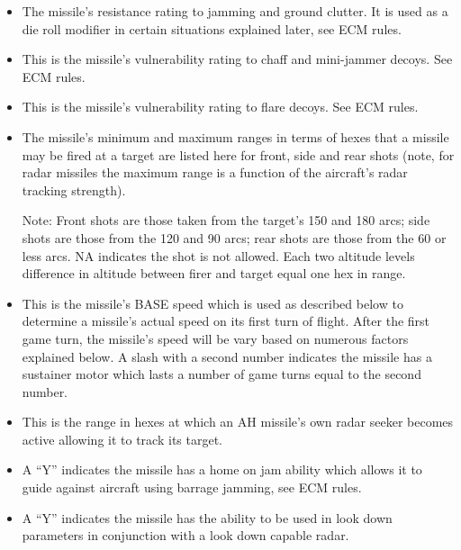 {\begin{itemize}
    \item {} The missile's resistance rating to jamming and ground clutter. It is used as a die roll modifier in certain situations explained later, see ECM rules.

    \item {} This is the missile's vulnerability rating to chaff and mini-jammer decoys. See ECM rules.

    \item {} This is the missile's vulnerability rating to flare decoys. See ECM rules.

    \item {} The missile's minimum and maximum ranges in terms of hexes that a missile may be fired at a target are listed here for front, side and rear shots (note, for radar missiles the maximum range is a function of the aircraft's radar tracking strength).

    Note: Front shots are those taken from the target's 150 and 180 arcs; side shots are those from the 120 and 90 arcs; rear shots are those from the 60 or less arcs. NA indicates the shot is not allowed. Each two altitude levels difference in altitude between firer and target equal one hex in range.

    \item {} This is the missile's BASE speed which is used as described below to determine a missile's actual speed on its first turn of flight. After the first game turn, the missile's speed will be vary based on numerous factors explained below. A slash with a second number indicates the missile has a sustainer motor which lasts a number of game turns equal to the second number.

    \item {} This is the range in hexes at which an AH missile's own radar seeker becomes active allowing it to track its target.

    \item {} A “Y” indicates the missile has a home on jam ability which allows it to guide against aircraft using barrage jamming, see ECM rules.

    \item {} A “Y” indicates the missile has the ability to be used in look down parameters in conjunction with a look down capable radar.


\end{itemize}}

